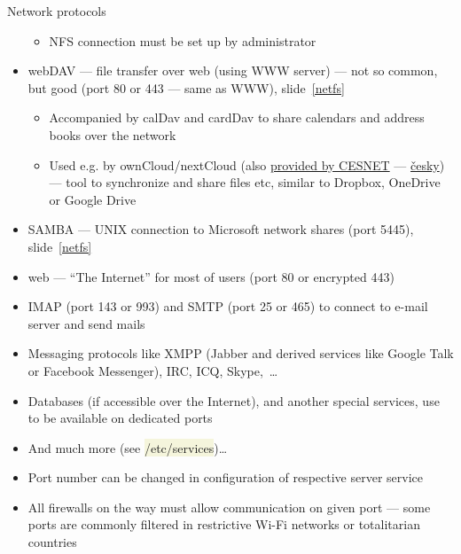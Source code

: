 \documentclass[compress, xelatex, 11pt, xcolor=svgnames, aspectratio=169,
	hyperref={
		bookmarks=true,
		unicode=true,
		colorlinks=true,
		pdftitle={Linux, command line and MetaCentrum},
		plainpages=false,
		pdfauthor={Vojtech Zeisek},
		pdfsubject={Course about use of Linux command line, writing shell scripts and using MetaCentrum of CESNET},
		pdfcreator={XeLaTeX},
		pdfkeywords={Linux, GNU, BASH, shell, command line, MetaCentrum},
		linkcolor=DarkRed, %
		anchorcolor=DarkBlue, %
		citecolor=Indigo, %
		filecolor=NavyBlue, %
		menucolor=DarkMagenta, %
		urlcolor=DarkBlue, %
		},
	url={hyphens, lowtilde} %
	]{beamer}
\renewcommand{\texttt}[1]{\colorbox{Beige}{{\ttfamily #1}}}
\begin{document}
\begin{frame}[allowframebreaks]{Network protocols}
\begin{itemize}
		\begin{itemize}
			\item NFS connection must be set up by administrator
		\end{itemize}
		\item webDAV --- file transfer over web (using WWW server) --- not so common, but good (port 80 or 443 --- same as WWW), slide~\ref{netfs}
		\begin{itemize}
			\item Accompanied by calDav and cardDav to share calendars and address books over the network
			\item Used e.g. by ownCloud/nextCloud (also \href{https://du.cesnet.cz/en/navody/owncloud/start}{provided by CESNET} --- \href{https://du.cesnet.cz/cs/navody/owncloud/start}{česky}) --- tool to synchronize and share files etc, similar to Dropbox, OneDrive or Google Drive
		\end{itemize}
		\item SAMBA --- UNIX connection to Microsoft network shares (port 5445), slide~\ref{netfs}
		\item web --- \enquote{The Internet} for most of users (port 80 or encrypted 443)
		\item IMAP (port 143 or 993) and SMTP (port 25 or 465) to connect to e-mail server and send mails
		\item Messaging protocols like XMPP (Jabber and derived services like Google Talk or Facebook Messenger), IRC, ICQ, Skype,~\ldots
		\item Databases (if accessible over the Internet), and another special services, use to be available on dedicated ports
		\item And much more (see \texttt{/etc/services})\ldots
		\item Port number can be changed in configuration of respective server service
		\item All firewalls on the way must allow communication on given port --- some ports are commonly filtered in restrictive Wi-Fi networks or totalitarian countries
	\end{itemize}
\end{frame}
\end{document}
